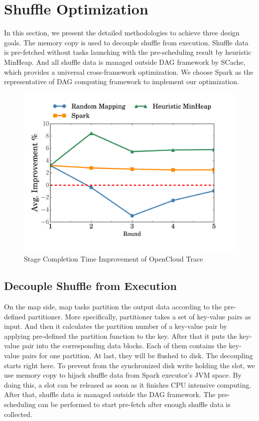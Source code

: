 \section{Shuffle Optimization}
In this section, we present the detailed methodologies to achieve three design goals. The memory copy is used to decouple shuffle from execution. Shuffle data is pre-fetched without tasks launching with the pre-scheduling result by heuristic MinHeap. And all shuffle data is managed outside DAG framework by SCache, which provides a universal cross-framework optimization.
We choose Spark as the representative of DAG computing framework to implement our optimization.

\begin{figure}
	\centering
	\includegraphics[width=0.9\linewidth]{fig/sim}
	\caption{Stage Completion Time Improvement of OpenCloud Trace}
	\label{fig:sim}
\end{figure}

\subsection{Decouple Shuffle from Execution}
On the map side, map tasks partition the output data according to the pre-defined partitioner. More specifically, partitioner takes a set of key-value pairs as input. And then it calculates the partition number of a key-value pair by applying pre-defined the partition function to the key. After that it puts the key-value pair into the corresponding data blocks. Each of them contains the key-value pairs for one partition. At last, they will be flushed to disk. The decoupling starts right here. To prevent from the synchronized disk write holding the slot, we use memory copy to hijack shuffle data from Spark executor's JVM space. By doing this, a slot can be released as soon as it finishes CPU intensive computing. After that, shuffle data is managed outside the DAG framework. The pre-scheduling can be performed to start pre-fetch after enough shuffle data is collected.

